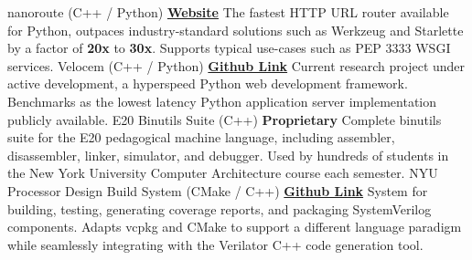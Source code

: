 \documentclass[9pt]{developercv} %
\begin{document}
\begin{fullentrylist}
	\fullentry
	{nanoroute (C++ / Python)}
	{
		{\href{https://nanoroute.dev/}{\textbf{Website}}}
	}
	{
		The fastest HTTP URL router available for Python, outpaces industry-standard
		solutions such as Werkzeug and Starlette by a factor of \textbf{20x} to
		\textbf{30x}. Supports typical use-cases such as PEP 3333 WSGI services.
	}
	\fullentry
	{Velocem (C++ / Python)}
	{
		{\href{https://github.com/nickelpro/velocem}{\textbf{Github Link}}}
	}
	{
		Current research project under active development, a hyperspeed Python web
		development framework. Benchmarks as the lowest latency Python application
		server implementation publicly available.
	}
	\fullentry
	{E20 Binutils Suite (C++)}
	{\textbf{Proprietary}}
	{
		Complete binutils suite for the E20 pedagogical machine language, including
		assembler, disassembler, linker, simulator, and debugger. Used by hundreds of
		students in the New York University Computer Architecture course each
		semester.
	}
	\fullentry
	{NYU Processor Design Build System (CMake / C++)}
	{
		{\href{https://github.com/NYU-Processor-Design/component-template}{\textbf{Github Link}}}
	}
	{
		System for building, testing, generating coverage reports, and packaging
		SystemVerilog components. Adapts vcpkg and CMake to support a different
		language paradigm while seamlessly integrating with the Verilator C++ code
		generation tool.
	}
\end{fullentrylist}
\end{document}

